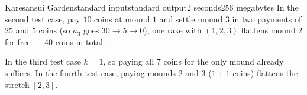 \begin{problem}{Karesansui Garden}{standard input}{standard output}{2 seconds}{256 megabytes}
In the second test case, pay $10$ coins at mound $1$ and settle mound $3$ in two payments of $25$ and $5$ coins (so $a_3$ goes $30 \to 5 \to 0$); one rake with $(1, 2, 3)$ flattens mound $2$ for free --- $40$ coins in total.

In the third test case $k = 1$, so paying all $7$ coins for the only mound already suffices. In the fourth test case, paying mounds $2$ and $3$ ($1 + 1$ coins) flattens the stretch $[2, 3]$.


\end{problem}

